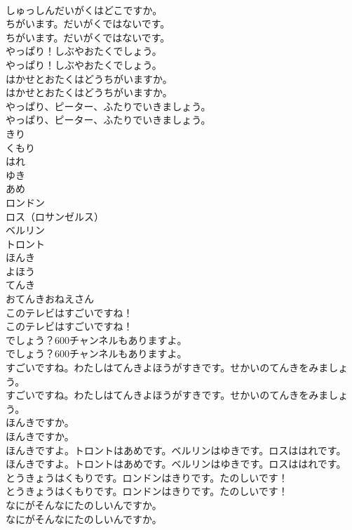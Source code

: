 \documentclass[8pt]{extreport}
\begin{document}
\begin{CJK}{UTF8}{min}
\\	しゅっしんだいがくはどこですか。 
\\	ちがいます。だいがくではないです。	
\\	ちがいます。だいがくではないです。 
\\	やっぱり！しぶやおたくでしょう。	
\\	やっぱり！しぶやおたくでしょう。 
\\	はかせとおたくはどうちがいますか。	
\\	はかせとおたくはどうちがいますか。 
\\	やっぱり、ピーター、ふたりでいきましょう。	
\\	やっぱり、ピーター、ふたりでいきましょう。 
\\	きり
\\	くもり
\\	はれ
\\	ゆき
\\	あめ
\\	ロンドン
\\	ロス（ロサンゼルス）
\\	ベルリン
\\	トロント
\\	ほんき
\\	よほう
\\	てんき
\\	おてんきおねえさん
\\	このテレビはすごいですね！	
\\	このテレビはすごいですね！ 
\\	でしょう？600チャンネルもありますよ。	
\\	でしょう？600チャンネルもありますよ。 
\\	すごいですね。わたしはてんきよほうがすきです。せかいのてんきをみましょう。	
\\	すごいですね。わたしはてんきよほうがすきです。せかいのてんきをみましょう。 
\\	ほんきですか。	
\\	ほんきですか。 
\\	ほんきですよ。トロントはあめです。ベルリンはゆきです。ロスははれです。	
\\	ほんきですよ。トロントはあめです。ベルリンはゆきです。ロスははれです。 
\\	とうきょうはくもりです。ロンドンはきりです。たのしいです！	
\\	とうきょうはくもりです。ロンドンはきりです。たのしいです！ 
\\	なにがそんなにたのしいんですか。	
\\	なにがそんなにたのしいんですか。 

\end{CJK}
\end{document}
